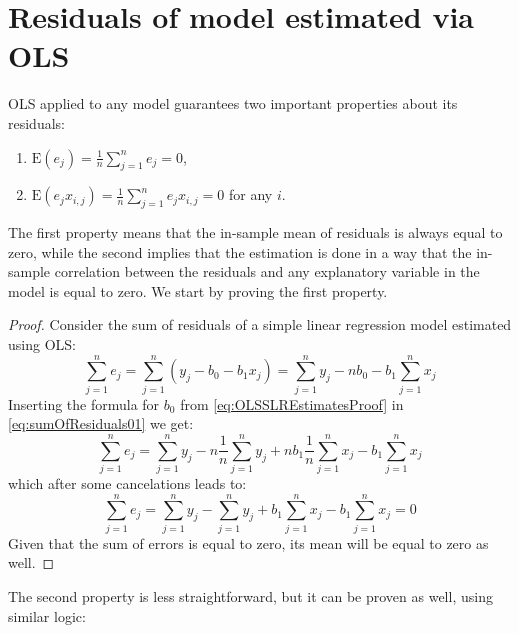 \documentclass[
]{book}
\providecommand{\tightlist}{%
  \setlength{\itemsep}{0pt}\setlength{\parskip}{0pt}}
\theoremstyle{definition}
\theoremstyle{definition}
\theoremstyle{definition}
\theoremstyle{definition}
\theoremstyle{remark}
\begin{document}
\hypertarget{OLSResiduals}{%
\section{Residuals of model estimated via OLS}\label{OLSResiduals}}

OLS applied to any model guarantees two important properties about its residuals:

\begin{enumerate}
\def\labelenumi{\arabic{enumi}.}
\tightlist
\item
  \(\mathrm{E}(e_j) = \frac{1}{n} \sum_{j=1}^n e_j = 0\),
\item
  \(\mathrm{E}(e_j x_{i,j}) = \frac{1}{n} \sum_{j=1}^n e_j x_{i,j} = 0\) for any \(i\).
\end{enumerate}

The first property means that the in-sample mean of residuals is always equal to zero, while the second implies that the estimation is done in a way that the in-sample correlation between the residuals and any explanatory variable in the model is equal to zero. We start by proving the first property.

\begin{proof}
Consider the sum of residuals of a simple linear regression model estimated using OLS:
\begin{equation}
    \sum_{j=1}^n e_j = \sum_{j=1}^n (y_j - b_0 - b_1 x_j) = \sum_{j=1}^n y_j - n b_0 - b_1  \sum_{j=1}^n x_j
    \label{eq:sumOfResiduals01}
\end{equation}
Inserting the formula for \(b_0\) from \eqref{eq:OLSSLREstimatesProof} in \eqref{eq:sumOfResiduals01} we get:
\begin{equation}
    \sum_{j=1}^n e_j = \sum_{j=1}^n y_j - n \frac{1}{n}\sum_{j=1}^n y_j + n b_1 \frac{1}{n}\sum_{j=1}^n x_j - b_1  \sum_{j=1}^n x_j
    \label{eq:sumOfResiduals02}
\end{equation}
which after some cancelations leads to:
\begin{equation}
    \sum_{j=1}^n e_j = \sum_{j=1}^n y_j - \sum_{j=1}^n y_j + b_1 \sum_{j=1}^n x_j - b_1 \sum_{j=1}^n x_j = 0
    \label{eq:sumOfResiduals03}
\end{equation}
Given that the sum of errors is equal to zero, its mean will be equal to zero as well.
\end{proof}

The second property is less straightforward, but it can be proven as well, using similar logic:
\end{document}

